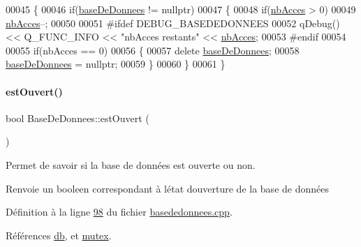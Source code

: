 \begin{DoxyCode}
00045 \{
00046     \textcolor{keywordflow}{if}(\hyperlink{class_base_de_donnees_a822ba0b7cf85b1e48ced8efd3d65e266}{baseDeDonnees} != \textcolor{keyword}{nullptr})
00047     \{
00048         \textcolor{keywordflow}{if}(\hyperlink{class_base_de_donnees_a5099ecb2922bb31d84cd5d4505298a29}{nbAcces} > 0)
00049             \hyperlink{class_base_de_donnees_a5099ecb2922bb31d84cd5d4505298a29}{nbAcces}--;
00050 
00051 \textcolor{preprocessor}{        #ifdef DEBUG\_BASEDEDONNEES}
00052         qDebug() << Q\_FUNC\_INFO << \textcolor{stringliteral}{"nbAcces restants"} << \hyperlink{class_base_de_donnees_a5099ecb2922bb31d84cd5d4505298a29}{nbAcces};
00053 \textcolor{preprocessor}{        #endif}
00054 
00055         \textcolor{keywordflow}{if}(nbAcces == 0)
00056         \{
00057             \textcolor{keyword}{delete} \hyperlink{class_base_de_donnees_a822ba0b7cf85b1e48ced8efd3d65e266}{baseDeDonnees};
00058             \hyperlink{class_base_de_donnees_a822ba0b7cf85b1e48ced8efd3d65e266}{baseDeDonnees} = \textcolor{keyword}{nullptr};
00059         \}
00060     \}
00061 \}
\end{DoxyCode}
\mbox{\label{class_base_de_donnees_af9ac332082ffd0dd35e412cefabe5e9c}} 
\paragraph{\texorpdfstring{est\+Ouvert()}{estOuvert()}}
{\footnotesize\ttfamily bool Base\+De\+Donnees\+::est\+Ouvert (\begin{DoxyParamCaption}{ }\end{DoxyParamCaption})}



Permet de savoir si la base de données est ouverte ou non. 

\begin{DoxyReturn}{Renvoie}
un booleen correspondant à l\textquotesingle{}état d\textquotesingle{}ouverture de la base de données 
\end{DoxyReturn}


Définition à la ligne \hyperlink{basededonnees_8cpp_source_l00098}{98} du fichier \hyperlink{basededonnees_8cpp_source}{basededonnees.\+cpp}.



Références \hyperlink{basededonnees_8h_source_l00030}{db}, et \hyperlink{basededonnees_8h_source_l00031}{mutex}.


